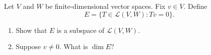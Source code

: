 Let $V$ and $W$ be finite-dimensional vector spaces. Fix $v \in V$. Define
    \[
        E = \{ T \in \mathcal{L}(V,W) : Tv=0 \}.
    \]
    \begin{enumerate}
    \item Show that $E$ is a subspace of $\mathcal{L}(V,W)$.
    \item Suppose $v \ne 0$.  What is $\dim E$?
    \end{enumerate}